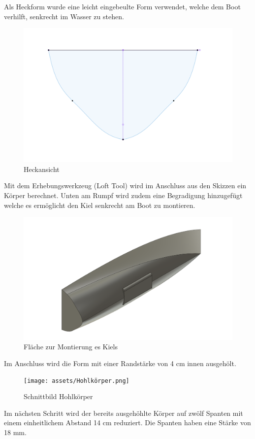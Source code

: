 Als Heckform wurde eine leicht eingebeulte Form verwendet, welche dem Boot verhilft, senkrecht im Wasser zu stehen.

\begin{figure}[H]
    \centering
    \includegraphics[width=0.6\linewidth]{assets/Heck_boot.png}
    \caption{Heckansicht}
   
\end{figure}

Mit dem Erhebungswerkzeug (Loft Tool) wird im Anschluss aus den Skizzen ein Körper berechnet. Unten am Rumpf wird zudem eine Begradigung hinzugefügt welche es ermöglicht den Kiel senkrecht am Boot zu montieren.
\begin{figure}[H]
    \centering
    \includegraphics[width=0.75\linewidth]{assets/kielbefestigung2image.png}
    \caption{Fläche zur Montierung es Kiels}
    \label{fig:enter-label}
\end{figure}

Im Anschluss wird die Form mit einer Randstärke von 4 cm innen ausgehölt. 
\begin{figure}[H]
    \centering
    \texttt{[image: assets/Hohlkörper.png]}
    \caption{Schnittbild Hohlkörper}

\end{figure}
Im nächsten Schritt wird der bereits ausgehöhlte Körper auf zwölf Spanten mit einem einheitlichem Abstand 14 cm reduziert. Die Spanten haben eine Stärke von 18 mm. 


